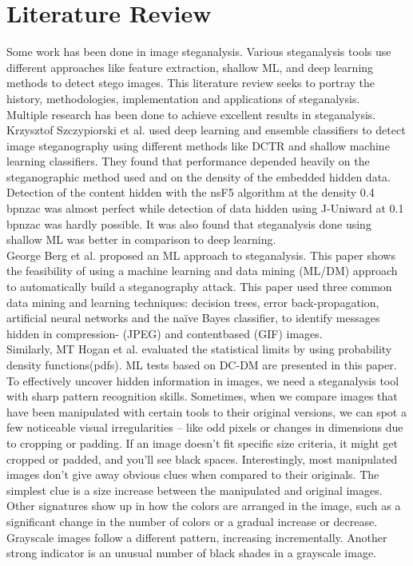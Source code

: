 \chapter{Literature Review}
Some work has been done in image steganalysis. Various steganalysis tools use different approaches like feature extraction, shallow ML, and deep learning methods to detect stego images. This literature review seeks to portray the history, methodologies, implementation and applications of steganalysis.\\
Multiple research has been done to achieve excellent results in steganalysis. Krzysztof Szczypiorski et al.\cite{1} used deep learning and ensemble classifiers to detect image steganography using different methods like DCTR and shallow machine learning classifiers. They found that performance depended heavily on the steganographic method used and on the density of the embedded hidden data. Detection of the content hidden with the nsF5 algorithm at the density 0.4 bpnzac was almost perfect while detection of data hidden using J-Uniward at 0.1 bpnzac was hardly possible. It was also found that steganalysis done using shallow ML was better in comparison to deep learning.\\
George Berg et al.\cite{2} proposed an ML approach to steganalysis. This paper shows the feasibility of using a machine learning and data mining (ML/DM) approach to automatically build a steganography attack. This paper used three common data mining and learning techniques: decision trees, error back-propagation, artificial neural networks and the naïve Bayes classifier, to identify messages hidden in compression- (JPEG) and contentbased (GIF) images.\\
Similarly, MT Hogan et al.\cite{3} evaluated the statistical limits by using probability density functions(pdfs). ML tests based on DC-DM are presented in this paper. \\
To effectively uncover hidden information in images, we need a steganalysis tool with sharp pattern recognition skills. Sometimes, when we compare images that have been manipulated with certain tools to their original versions, we can spot a few noticeable visual irregularities – like odd pixels or changes in dimensions due to cropping or padding. If an image doesn't fit specific size criteria, it might get cropped or padded, and you'll see black spaces. Interestingly, most manipulated images don't give away obvious clues when compared to their originals. The simplest clue is a size increase between the manipulated and original images. Other signatures show up in how the colors are arranged in the image, such as a significant change in the number of colors or a gradual increase or decrease. Grayscale images follow a different pattern, increasing incrementally. Another strong indicator is an unusual number of black shades in a grayscale image.

